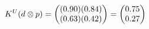 \documentclass[preview]{standalone}
\begin{document}
\begin{align*}
\special{dvisvgm:raw <g id='unique000'>}K^U(d \otimes p) = \begin{pmatrix} (0.90)(0.84) \\ (0.63)(0.42) \end{pmatrix} = \begin{pmatrix} 0.75 \\ 0.27 \end{pmatrix}\special{dvisvgm:raw </g>}
\end{align*}
\end{document}
